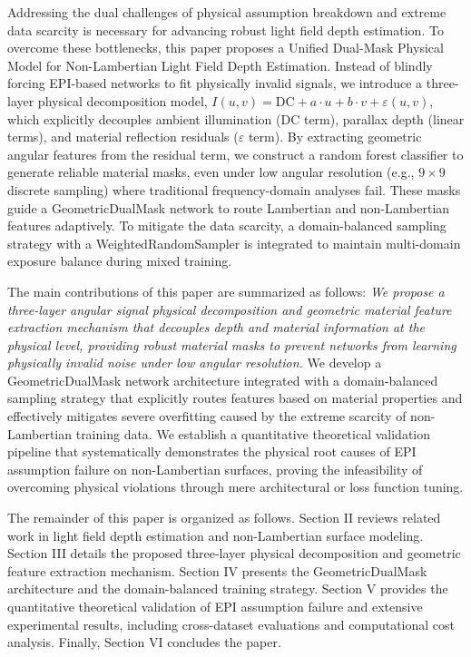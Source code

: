 Addressing the dual challenges of physical assumption breakdown and extreme data scarcity is necessary for advancing robust light field depth estimation. To overcome these bottlenecks, this paper proposes a Unified Dual-Mask Physical Model for Non-Lambertian Light Field Depth Estimation. Instead of blindly forcing EPI-based networks to fit physically invalid signals, we introduce a three-layer physical decomposition model, $I(u,v) = \text{DC} + a \cdot u + b \cdot v + \varepsilon(u,v)$, which explicitly decouples ambient illumination (DC term), parallax depth (linear terms), and material reflection residuals ($\varepsilon$ term). By extracting geometric angular features from the residual term, we construct a random forest classifier to generate reliable material masks, even under low angular resolution (e.g., $9 \times 9$ discrete sampling) where traditional frequency-domain analyses fail. These masks guide a GeometricDualMask network to route Lambertian and non-Lambertian features adaptively. To mitigate the data scarcity, a domain-balanced sampling strategy with a WeightedRandomSampler is integrated to maintain multi-domain exposure balance during mixed training.

The main contributions of this paper are summarized as follows:
\textit{ We propose a three-layer angular signal physical decomposition and geometric material feature extraction mechanism that decouples depth and material information at the physical level, providing robust material masks to prevent networks from learning physically invalid noise under low angular resolution.
} We develop a GeometricDualMask network architecture integrated with a domain-balanced sampling strategy that explicitly routes features based on material properties and effectively mitigates severe overfitting caused by the extreme scarcity of non-Lambertian training data.
We establish a quantitative theoretical validation pipeline that systematically demonstrates the physical root causes of EPI assumption failure on non-Lambertian surfaces, proving the infeasibility of overcoming physical violations through mere architectural or loss function tuning.

The remainder of this paper is organized as follows. Section II reviews related work in light field depth estimation and non-Lambertian surface modeling. Section III details the proposed three-layer physical decomposition and geometric feature extraction mechanism. Section IV presents the GeometricDualMask architecture and the domain-balanced training strategy. Section V provides the quantitative theoretical validation of EPI assumption failure and extensive experimental results, including cross-dataset evaluations and computational cost analysis. Finally, Section VI concludes the paper.

